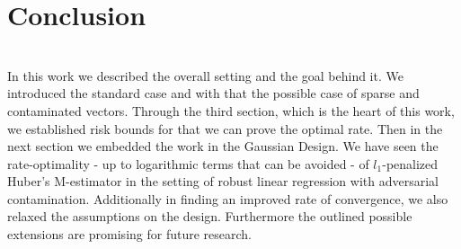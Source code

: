\documentclass[a4paper,10pt]{article}
\theoremstyle{definition}
\begin{document}
\section{Conclusion}\ \\

In this work we described the overall setting and the goal behind it. We introduced the standard case and with that the possible case of sparse and contaminated vectors. Through the third section, which is the heart of this work, we established risk bounds for that we can prove the optimal rate. Then in the next section we embedded the work in the Gaussian Design.
We have seen the rate-optimality - up to logarithmic terms that can be avoided - of $l_1$-penalized Huber's M-estimator in the setting of robust linear regression with adversarial contamination. 
Additionally in finding an improved rate of convergence, we also relaxed the assumptions on the design. Furthermore the outlined possible extensions are promising for future research.
\end{document}
